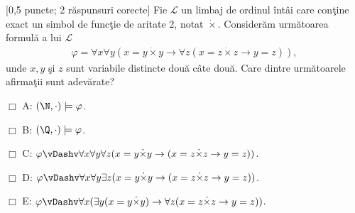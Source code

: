 \documentclass[12pt]{article}
\newcommand{\probex}{\stepcounter{uebno}{\vspace{0.3cm}\noindent \bf (P\arabic{uebno}) }}
\newcommand{\solutiong}[1]{$\,$ \\ \begin{proof}\mbox{}\\#1 \qed \end{proof}}
\renewcommand{\boxtimes}{\Box}
\renewcommand{\solutiong}[1]{}
\begin{document}
\solutiong{
    A: se aplic\u{a} succesiv echivalen\c{t}a $\varphi \wedge \psi \to \chi \ \sim \ \varphi \to (\psi \to \chi)$. \\ 
    E: Avem 
    \begin{align*}
        &(v_0 \wedge v_1 \wedge v_2 \wedge v_3) \to v_4 \quad\sim\\ 
        &\neg(v_0 \wedge v_1 \wedge v_2 \wedge v_3) \vee v_4 \quad\sim \\ 
        &\neg v_0 \vee \neg v_1 \vee \neg v_2 \vee \neg v_3 \vee v_4,
    \end{align*}
    unde ultima formul\u{a} este at\^{a}t \^{i}n FND, c\^{a}t \c{s}i \^{i}n FNC.

    Fie $e$ o evaluare cu $e(v_1) = 1$ \c{s}i $e(v_0) = e(v_2) = e(v_3) = e(v_4) = 0$.
    Avem \\ 
    B: $e \models \varphi$, dar $e \not{\models} (((v_0 \to v_1) \to v_2) \to v_3) \to v_4$ \\ 
    C: $e \models \varphi$, dar $e \not{\models} v_1 \to v_4$ \\
    D: $e \models \varphi$, dar $e \not{\models} (v_0 \vee v_1 \vee v_2 \vee v_3) \to v_4$
    
}

\probex 
[0,5 puncte; 2 r\u{a}spunsuri corecte]
Fie $\mathcal{L}$ un limbaj de ordinul \^{i}nt\^{a}i care con\c{t}ine exact un simbol de func\c{t}ie de aritate 2,
notat $\dot{\times}$. 
Consider\u{a}m urm\u{a}toarea formul\u{a} a lui $\mathcal{L}$
\begin{align*}
\varphi = \forall x \forall y (x = y \dot{\times} y \to \forall z (x = z \dot{\times} z \to y = z)),
\end{align*} 
unde $x, y$ \c{s}i $z$ sunt variabile distincte dou\u{a} c\^{a}te dou\u{a}.
Care dintre urm\u{a}toarele afirma\c{t}ii sunt adev\u{a}rate? 

$\boxtimes$ A: $(\N, \cdot) \models \varphi$. 

$\Box$ B: $(\Q, \cdot) \models \varphi$.

$\boxtimes$ C: $\varphi \vDashv \forall x \forall y \forall z (x = y \dot{\times} y \to (x = z \dot{\times} z \to y = z))$.

$\Box$ D: $\varphi \vDashv \forall x \forall y \exists z (x = y \dot{\times} y \to (x = z \dot{\times} z \to y = z))$.

$\Box$ E: $\varphi \vDashv \forall x (\exists y (x = y \dot{\times} y) \to \forall z (x = z \dot{\times} z \to y = z))$.

\solutiong{
    Observ\u{a}m c\u{a} $\varphi$ este satisf\u{a}cut \^{i}n 
    $(\N, \cdot)$ (sau $(\Q, \cdot)$) dac\u{a} \c{s}i numai dac\u{a} 
    pentru orice num\u{a}r din $\N$ (resp. din $\Q$), dac\u{a} acesta are o 
    `r\u{a}d\u{a}cin\u{a} p\u{a}trat\u{a}', aceasta este unic\u{a}.  
    Afirma\c{t}ia este adev\u{a}rat\u{a} \^{i}n $\N$, dar nu \c{s}i \^{i}n 
    $\Q$ (e.g. $1 \cdot 1 = (-1) \cdot (-1) = 1$).
    Formula de la C este o form\u{a} normal\u{a} prenex pentru $\varphi$.
}
\end{document}

